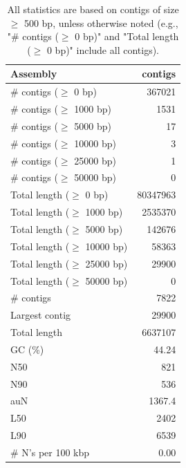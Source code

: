 \documentclass[12pt,a4paper]{article}
\begin{document}
\begin{table}[ht]
\begin{center}
\caption{All statistics are based on contigs of size $\geq$ 500 bp, unless otherwise noted (e.g., "\# contigs ($\geq$ 0 bp)" and "Total length ($\geq$ 0 bp)" include all contigs).}
\begin{tabular}{|l*{1}{|r}|}
\hline
Assembly & contigs \\ \hline
\# contigs ($\geq$ 0 bp) & 367021 \\ \hline
\# contigs ($\geq$ 1000 bp) & 1531 \\ \hline
\# contigs ($\geq$ 5000 bp) & 17 \\ \hline
\# contigs ($\geq$ 10000 bp) & 3 \\ \hline
\# contigs ($\geq$ 25000 bp) & 1 \\ \hline
\# contigs ($\geq$ 50000 bp) & 0 \\ \hline
Total length ($\geq$ 0 bp) & 80347963 \\ \hline
Total length ($\geq$ 1000 bp) & 2535370 \\ \hline
Total length ($\geq$ 5000 bp) & 142676 \\ \hline
Total length ($\geq$ 10000 bp) & 58363 \\ \hline
Total length ($\geq$ 25000 bp) & 29900 \\ \hline
Total length ($\geq$ 50000 bp) & 0 \\ \hline
\# contigs & 7822 \\ \hline
Largest contig & 29900 \\ \hline
Total length & 6637107 \\ \hline
GC (\%) & 44.24 \\ \hline
N50 & 821 \\ \hline
N90 & 536 \\ \hline
auN & 1367.4 \\ \hline
L50 & 2402 \\ \hline
L90 & 6539 \\ \hline
\# N's per 100 kbp & 0.00 \\ \hline
\end{tabular}
\end{center}
\end{table}
\end{document}
